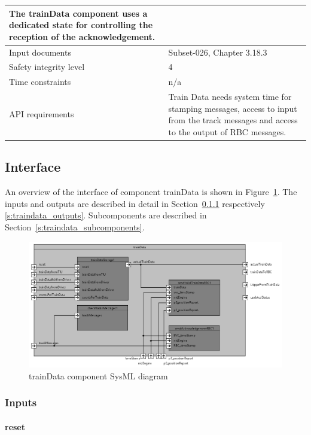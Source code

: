 \begin{longtable}{p{}p{}}
The trainData component uses a dedicated state for controlling the reception of the acknowledgement.\\
\midrule
Input documents	& Subset-026, Chapter 3.18.3\\
\midrule
Safety integrity level	& 4 \\
\midrule
Time constraints		& n/a \\
\midrule
API requirements 		& Train Data needs system time for stamping messages, access to input from the track messages and access to the output of RBC messages.\\
\bottomrule
\end{longtable}


\subsection{Interface}

An overview of the interface of component trainData is shown in Figure~\ref{f:traindata_interface}. The inputs and outputs are described in detail in Section~\ref{s:traindata_inputs} respectively \ref{s:traindata_outputs}. Subcomponents are described in Section~\ref{s:traindata_subcomponents}.

\begin{figure}
\center
\includegraphics[width=\textwidth]{./images/Figure_15_IBD_manageTrainData_1.png}
\caption{trainData component SysML diagram}\label{f:traindata_interface}
\end{figure}


\subsubsection{Inputs}\label{s:traindata_inputs}

\paragraph{reset}

